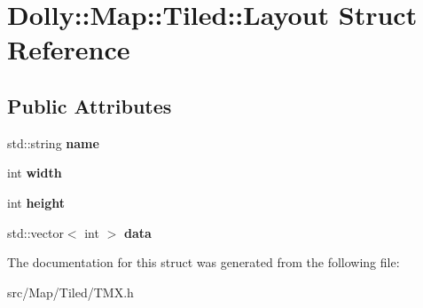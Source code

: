\hypertarget{struct_dolly_1_1_map_1_1_tiled_1_1_layout}{}\section{Dolly\+:\+:Map\+:\+:Tiled\+:\+:Layout Struct Reference}
\label{struct_dolly_1_1_map_1_1_tiled_1_1_layout}
\subsection*{Public Attributes}
\begin{DoxyCompactItemize}
\item 
\mbox{\label{struct_dolly_1_1_map_1_1_tiled_1_1_layout_a576db69b8f0883cc65e2382b41609f67}} 
std\+::string {\bfseries name}
\item 
\mbox{\label{struct_dolly_1_1_map_1_1_tiled_1_1_layout_a97ae72d735e6c2527fcf236ce432baac}} 
int {\bfseries width}
\item 
\mbox{\label{struct_dolly_1_1_map_1_1_tiled_1_1_layout_ab91bcde83ab44488dac8279fce4cf126}} 
int {\bfseries height}
\item 
\mbox{\label{struct_dolly_1_1_map_1_1_tiled_1_1_layout_adcf9de01d046814dea5e4de3bc9bdc4e}} 
std\+::vector$<$ int $>$ {\bfseries data}
\end{DoxyCompactItemize}


The documentation for this struct was generated from the following file\+:\begin{DoxyCompactItemize}
\item 
src/\+Map/\+Tiled/T\+M\+X.\+h\end{DoxyCompactItemize}
